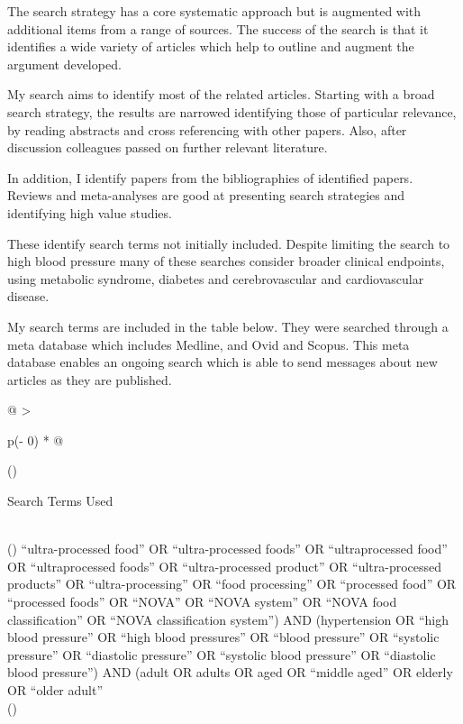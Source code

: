 \documentclass[
]{article}
\begin{document}
The search strategy has a core systematic approach but is augmented with
additional items from a range of sources. The success of the search is
that it identifies a wide variety of articles which help to outline and
augment the argument developed.

My search aims to identify most of the related articles. Starting with a
broad search strategy, the results are narrowed identifying those of
particular relevance, by reading abstracts and cross referencing with
other papers. Also, after discussion colleagues passed on further
relevant literature.

In addition, I identify papers from the bibliographies of identified
papers. Reviews and meta-analyses are good at presenting search
strategies and identifying high value studies.

These identify search terms not initially included. Despite limiting the
search to high blood pressure many of these searches consider broader
clinical endpoints, using metabolic syndrome, diabetes and
cerebrovascular and cardiovascular disease.

My search terms are included in the table below. They were searched
through a meta database which includes Medline, and Ovid and Scopus.
This meta database enables an ongoing search which is able to send
messages about new articles as they are published.

\begin{longtable}[]{@{}
  >{\raggedright\arraybackslash}p{(\columnwidth - 0\tabcolsep) * }@{}}
\toprule()
\begin{minipage}[b]{\linewidth}\raggedright
Search Terms Used
\end{minipage} \\
\midrule()
\endhead
``ultra-processed food'' OR ``ultra-processed foods'' OR
``ultraprocessed food'' OR ``ultraprocessed foods'' OR ``ultra-processed
product'' OR ``ultra-processed products'' OR ``ultra-processing'' OR
``food processing'' OR ``processed food'' OR ``processed foods'' OR
``NOVA'' OR ``NOVA system'' OR ``NOVA food classification'' OR ``NOVA
classification system'') AND (hypertension OR ``high blood pressure'' OR
``high blood pressures'' OR ``blood pressure'' OR ``systolic pressure''
OR ``diastolic pressure'' OR ``systolic blood pressure'' OR ``diastolic
blood pressure'') AND (adult OR adults OR aged OR ``middle aged'' OR
elderly OR ``older adult'' \\
\bottomrule()
\end{longtable}
\end{document}
